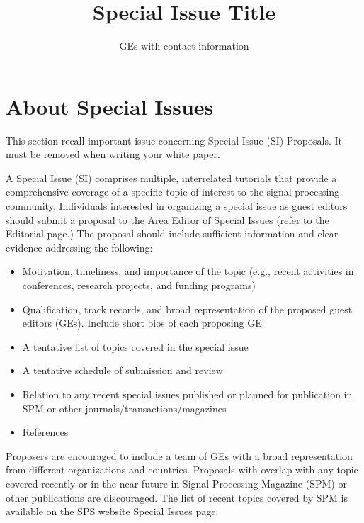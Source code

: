 \documentclass[journal,onecolumn]{IEEEtran}
\begin{document}
\title{Special Issue Title}
\author{GEs with contact information }

%
{}

\maketitle
\section*{About Special Issues}

{\color{blue} This section recall important issue concerning Special Issue (SI) Proposals. It must be removed when writing your white paper.}

A Special Issue (SI) comprises multiple, interrelated tutorials that provide a comprehensive coverage of a specific topic of interest to the signal processing community. Individuals interested in organizing a special issue as guest editors should submit a proposal to the Area Editor of Special Issues (refer to the Editorial page.) The proposal should include sufficient information and clear evidence addressing the following:
\begin{itemize}
        \item Motivation, timeliness, and importance of the topic (e.g., recent activities in conferences, research projects, and funding programs)
        \item Qualification, track records, and broad representation of the proposed guest editors (GEs). Include short bios of each proposing GE
        \item A tentative list of topics covered in the special issue
        \item A tentative schedule of submission and review
        \item Relation to any recent special issues published or planned for publication in SPM or other journals/transactions/magazines
        \item References
       
\end{itemize}

 Proposers are encouraged to include a team of GEs with a broad representation from different organizations and countries. Proposals with overlap with any topic covered recently or in the near future in Signal Processing Magazine (SPM) or other publications are discouraged. The list of recent topics covered by SPM is available on the SPS website Special Issues page.
 
\end{document}
